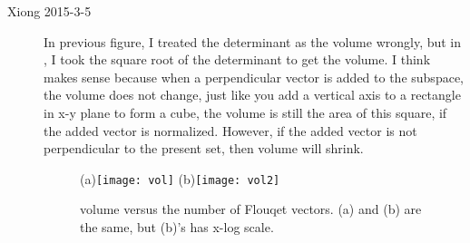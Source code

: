 \begin{description}
\item[Xiong 2015-3-5]
In previous figure, I treated the determinant as the volume wrongly, but in
, I took the square root of the determinant
to get the volume. I think  makes sense because
when a perpendicular vector is added to the subspace, the volume does not
change, just like you add a vertical axis to a rectangle in x-y plane
to form a cube, the
volume is still the area of this square, if the added vector is normalized.
However, if the added vector is not perpendicular to the present set,
then volume will shrink.
  \begin{figure}
    \centering
    (a)\texttt{[image: vol]}
    (b)\texttt{[image: vol2]}
    \caption{volume versus the number of Flouqet vectors. (a) and
      (b) are the same, but (b)'s has x-log scale.
    }
    \label{fig:volFloquet}
  \end{figure}


\end{description}
